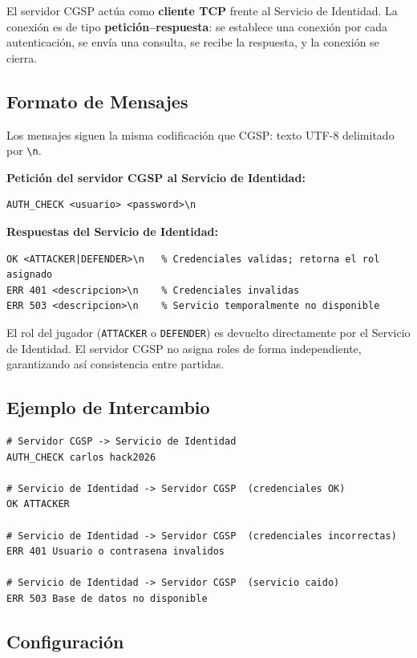 \documentclass[12pt, letterpaper]{article}
\begin{document}
El servidor CGSP actúa como \textbf{cliente TCP} frente al Servicio de Identidad.
La conexión es de tipo \textbf{petición--respuesta}: se establece una conexión por
cada autenticación, se envía una consulta, se recibe la respuesta, y la conexión
se cierra.

\subsection{Formato de Mensajes}

Los mensajes siguen la misma codificación que CGSP: texto UTF-8 delimitado por
\texttt{\textbackslash{}n}.

\textbf{Petición del servidor CGSP al Servicio de Identidad:}
\begin{lstlisting}
AUTH_CHECK <usuario> <password>\n
\end{lstlisting}

\textbf{Respuestas del Servicio de Identidad:}
\begin{lstlisting}
OK <ATTACKER|DEFENDER>\n   % Credenciales validas; retorna el rol asignado
ERR 401 <descripcion>\n    % Credenciales invalidas
ERR 503 <descripcion>\n    % Servicio temporalmente no disponible
\end{lstlisting}

\begin{nota}
El rol del jugador (\texttt{ATTACKER} o \texttt{DEFENDER}) es devuelto directamente
por el Servicio de Identidad. El servidor CGSP no asigna roles de forma independiente,
garantizando así consistencia entre partidas.
\end{nota}

\subsection{Ejemplo de Intercambio}

\begin{lstlisting}
# Servidor CGSP -> Servicio de Identidad
AUTH_CHECK carlos hack2026

# Servicio de Identidad -> Servidor CGSP  (credenciales OK)
OK ATTACKER

# Servicio de Identidad -> Servidor CGSP  (credenciales incorrectas)
ERR 401 Usuario o contrasena invalidos

# Servicio de Identidad -> Servidor CGSP  (servicio caido)
ERR 503 Base de datos no disponible
\end{lstlisting}

\subsection{Configuración}
\end{document}
